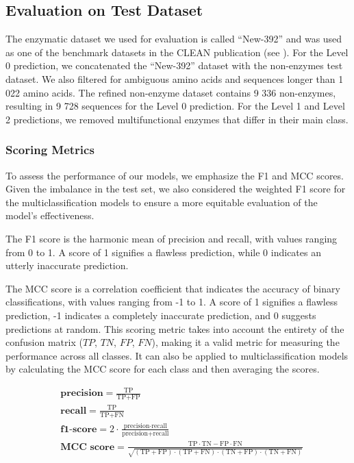 \documentclass{bioinfo}
\begin{document}
\begin{methods}
\subsection{Evaluation on Test Dataset}
The enzymatic dataset we used for evaluation is called ``New-392'' and was used as one of the benchmark datasets 
in the CLEAN publication (see \cite{CleanArticle}).
For the Level 0 prediction, we concatenated the ``New-392'' dataset with the non-enzymes test dataset.
We also filtered for ambiguous amino acids and sequences longer than 1 022 amino acids.
The refined non-enzyme dataset contains 9 336 non-enzymes, resulting in 9 728 sequences for the Level 0 prediction.
For the Level 1 and Level 2 predictions, we removed multifunctional enzymes that differ in their main class.

\subsubsection{Scoring Metrics}

To assess the performance of our models, we emphasize the F1 and MCC scores. 
Given the imbalance in the test set, we also considered the weighted F1 score for the multiclassification models
to ensure a more equitable evaluation of the model's effectiveness.

The F1 score is the harmonic mean of precision and recall, with values ranging from 0 to 1.
A score of 1 signifies a flawless prediction, while 0 indicates an utterly inaccurate prediction.

The MCC score is a correlation coefficient that indicates the accuracy of binary classifications, with values ranging from -1 to 1. 
A score of 1 signifies a flawless prediction, -1 indicates a completely inaccurate prediction, and 0 suggests predictions at random.
This scoring metric takes into account the entirety of the confusion matrix ($TP$, $TN$, $FP$, $FN$), making it a valid
metric for measuring the performance across all classes.
It can also be applied to multiclassification models by calculating the MCC score for each class and then averaging the scores.

\begin{align}
	&\textbf{precision} = \frac{\text{TP}}{\text{TP} + \text{FP}} \\
    &\textbf{recall} = \frac{\text{TP}}{\text{TP} + \text{FN}} \\
    &\textbf{f1-score} = 2 \cdot \frac{\text{precision} \cdot \text{recall}}{\text{precision} + \text{recall}} \\
    &\textbf{MCC score} = \frac{\text{TP} \cdot \text{TN} - \text{FP} \cdot \text{FN}}{\sqrt{(\text{TP} + \text{FP}) \cdot (\text{TP} + \text{FN}) \cdot (\text{TN} + \text{FP}) \cdot (\text{TN} + \text{FN})}}
\end{align}


\end{methods}
\end{document}
